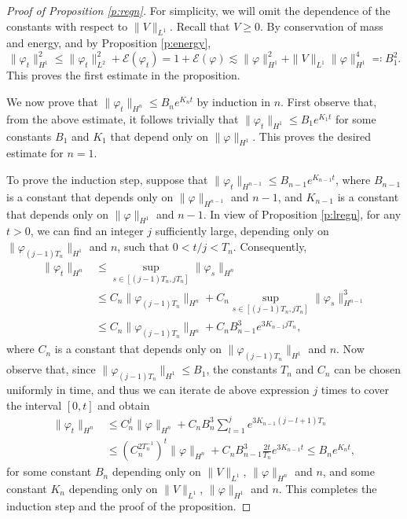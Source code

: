 \documentclass[11pt,a4paper]{scrartcl}
\begin{document}
\begin{proof}[Proof of Proposition \ref{p:regn}]
  For simplicity, we will omit the dependence of the constants with respect to
  $\| V \|_{L^1}$. Recall that $V \ge 0$. By conservation of mass and energy,
  and by Proposition \ref{p:energy},
  \[
    \| \varphi_t \|_{H^1}^2 \le \| \varphi_t \|_{L^2}^2 +
    \mathcal{E}(\varphi_t) = 1 + \mathcal{E}(\varphi) \apprle \| \varphi
    \|_{H^1}^2 + \| V \|_{L^1} \| \varphi \|_{H^1}^4 \eqqcolon B_1^2.
  \]
  This proves the first estimate in the proposition.


  We now prove that $\| \varphi_t \|_{H^n} \le B_n e^{K_n t}$ by induction in
  $n$. First observe that, from the above estimate, it follows trivially that
  $\| \varphi_t \|_{H^1} \le B_1 e^{K_1 t}$ for some constants $B_1$ and $K_1$
  that depend only on $\| \varphi \|_{H^1}$. This proves the desired estimate
  for $n=1$.


  To prove the induction step, suppose that $\| \varphi_t \|_{H^{n-1}} \le
  B_{n-1} e^{K_{n-1} t}$, where $B_{n-1}$ is a constant that depends only on
  $\| \varphi \|_{H^{n-1}}$ and $n-1$, and $K_{n-1}$ is a constant that
  depends only on $\| \varphi \|_{H^1}$ and $n-1$. In view of Proposition
  \ref{p:lregn}, for any $t > 0$, we can find an integer $j$ sufficiently
  large, depending only on $\| \varphi_{(j-1)T_n} \|_{H^1}$ and $n$, such that
  $0 < t/j < T_n$. Consequently,
  \begin{align*}
    \| \varphi_t \|_{H^n} & \le \sup_{s \in [(j-1)T_n, jT_n]} \| \varphi_s
    \|_{H^n} \\
    & \le C_n \| \varphi_{(j-1)T_n} \|_{H^n} + C_n \sup_{s \in [(j-1)T_n,
    jT_n]} \| \varphi_s \|_{H^{n-1}}^3 \\
    & \le C_n \| \varphi_{(j-1)T_n} \|_{H^n} + C_n B_{n-1}^3 e^{3 K_{n-1} j
    T_n},
  \end{align*}
  where $C_n$ is a constant that depends only on $\| \varphi_{(j-1)T_n}
  \|_{H^1}$ and $n$. Now observe that, since $\| \varphi_{(j-1)T_n} \|_{H^1}
  \le B_1$, the constants $T_n$ and $C_n$ can be chosen uniformly in time, and
  thus we can iterate de above expression $j$ times to cover the interval
  $[0,t]$ and obtain
  \begin{align*}
    \| \varphi_t \|_{H^n} & \le C_n^j \| \varphi \|_{H^n} + C_n B_n^3
    \sum_{l=1}^j e^{3 K_{n-1} (j-l+1)T_n} \\
    & \le (C_n^{2T_n^{-1}})^t \| \varphi \|_{H^n} + C_n B_{n-1}^3
    \frac{2t}{T_n} e^{3 K_{n-1} t} \le B_n e^{K_n t},
  \end{align*}
  for some constant $B_n$ depending only on $\| V \|_{L^1}$, $\| \varphi
  \|_{H^n}$ and $n$, and some constant $K_n$ depending only on $\| V
  \|_{L^1}$, $\| \varphi \|_{H^1}$ and $n$. This completes the induction step
  and the proof of the proposition.
\end{proof}
\end{document}
